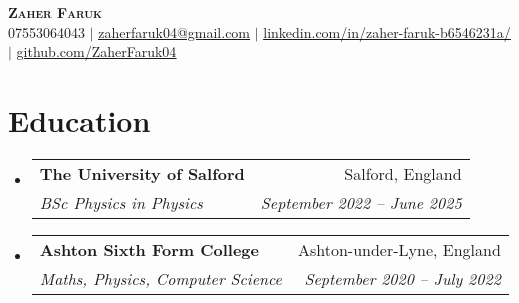 \documentclass[letterpaper,11pt]{article}
\makeatletter
\newcommand{\resumeSubheading}[4]{
  \vspace{-2pt}\item
    \begin{tabular*}{0.97\textwidth}[t]{l@{\extracolsep{\fill}}r}
      \textbf{#1} & #2 \\
      \textit{\small#3} & \textit{\small #4} \\
    \end{tabular*}\vspace{-7pt}
}
\newcommand{\resumeSubHeadingListStart}{\begin{itemize}[leftmargin=0.15in, label={}]}
\newcommand{\resumeSubHeadingListEnd}{\end{itemize}}
\makeatother
\begin{document}

\begin{center}
    \textbf{\Huge \scshape Zaher Faruk} \\ \vspace{1pt}
    \small 07553064043 $|$ \href{mailto:zaherfaruk@gmail.com}{\underline{zaherfaruk04@gmail.com}} $|$ 
    \href{https://www.linkedin.com/in/zaher-faruk-b6546231a/}{\underline{linkedin.com/in/zaher-faruk-b6546231a/}} $|$
    \href{https://github.com/ZaherFaruk04}{\underline{github.com/ZaherFaruk04}}
\end{center}


\section{Education}
  \resumeSubHeadingListStart
    \resumeSubheading
      {The University of Salford}{Salford, England}
      {BSc Physics in Physics}{September 2022 -- June 2025}
    \resumeSubheading
      {Ashton Sixth Form College}{Ashton-under-Lyne, England }
      {Maths, Physics, Computer Science}{September 2020 -- July 2022}
  \resumeSubHeadingListEnd
  
\end{document}
